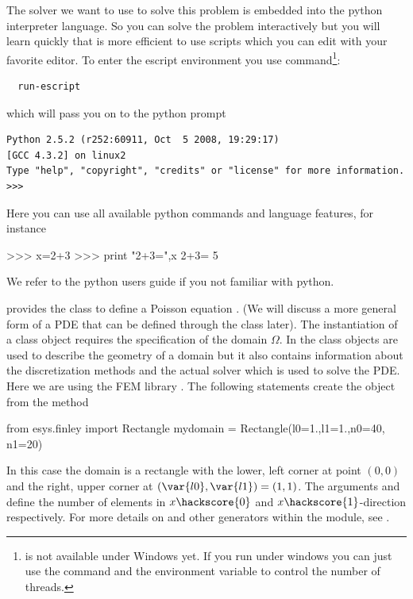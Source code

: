 The \escript solver we want to use to solve this problem is embedded into the python interpreter language. So you can solve the problem interactively but you will learn quickly 
that is more efficient to use scripts which you can edit with your favorite editor. 
To enter the escript environment you use  command\footnote{ is not available under Windows yet. If you run under windows you can just use the
 command and the  environment variable to control the number
of threads.}:
\begin{verbatim}
  run-escript
\end{verbatim}
which will pass you on to the python prompt
\begin{verbatim}
Python 2.5.2 (r252:60911, Oct  5 2008, 19:29:17) 
[GCC 4.3.2] on linux2
Type "help", "copyright", "credits" or "license" for more information.
>>> 
\end{verbatim}
Here you can use all available python commands and language features, for instance
\begin{python}
 >>> x=2+3
>>> print "2+3=",x
2+3= 5
\end{python}
We refer to the python users guide if you not familiar with python.

\escript provides the class \Poisson to define a Poisson equation .
(We will discuss a more general form of a PDE  
that can be defined through the \LinearPDE class later). The instantiation of
a \Poisson class object requires the specification of the domain $\Omega$. In \escript
the \Domain class objects are used to describe the geometry of a domain but it also
contains information about the discretization methods and the actual solver which is used
to solve the PDE. Here we are using the FEM library \finley {}. The following statements create the \Domain object  from the 
\finley method 
\begin{python}
  from esys.finley import Rectangle
  mydomain = Rectangle(l0=1.,l1=1.,n0=40, n1=20)
\end{python}
In this case the domain is a rectangle with the lower, left corner at point $(0,0)$ and
the right, upper corner at $(\var{l0},\var{l1})=(1,1)$.
The arguments  and  define the number of elements in $x\hackscore{0}$ and
$x\hackscore{1}$-direction respectively. For more details on  and
other \Domain generators within the \finley module,
see .

